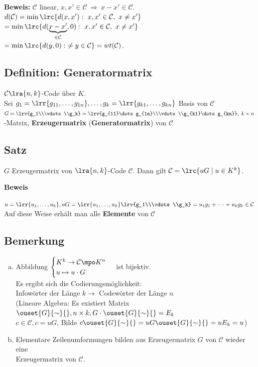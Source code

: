 		\textbf{Beweis:} $ \mathcal{C} $ linear, $ x,x'\in\mathcal{C}\ \Rightarrow\ x-x'\in\mathcal{C} $.\\
		$ d(\mathcal{C})=\min\lrc{d(x,x'):\ x,x'\in\mathcal{C},\ x\neq x'} $\\
		$ =\min\lrc{d(\underbrace{x-x'}_{\in\mathcal{C}},0):\ x,x'\in\mathcal{C},\ x\neq x'} $\\
		$ =\min\lrc{d(y,0):\  \neq y\in\mathcal{C}}=wt(\mathcal{C}) $.
		
	\subsection{Definition: Generatormatrix}
		$\mathcal{C}\lra{n,k}$-Code über $K$.\\
		Sei $g_1=\lrr{g_{11},\dots,g_{1n}},\dots,g_k=\lrr{g_{k1},\dots,g_{kn}}$ Basis von $\mathcal{C}$\\
		$G=\lrv{g_1\\\vdots\\g_k}=\lrv{g_{11}\dots g_{1n}\\\vdots\\g_{k1}\dots g_{kn}},\; k\times n$-Matrix, \textbf{Erzeugermatrix} (\textbf{Generatormatrix}) von $\mathcal{C}$

	\subsection{Satz}
		$G$ Erzeugermatrix von $\lra{n,k}$-Code $\mathcal{C}$. Dann gilt $\mathcal{C}=\lrc{uG\mid u\in K^k}$.

		\textbf{Beweis}

		$u=\lrr{u_1,\dots,u_k}, uG=\lrr{u_1,\dots,u_k}\lrv{g_1\\\vdots\\g_k}=u_1g_1+\dots+u_kg_k\in\mathcal{C}$\\
		Auf diese Weise erhält man alle \textbf{Elemente} von $\mathcal{C}$

	\subsection{Bemerkung}
		\begin{enumerate}[a)]
			\item Abbildung $\begin{cases} K^k\rightarrow\mathcal{C}\mpo K^n\\u\mapsto u\cdot G\end{cases}$ ist bijektiv.\\
				Es ergibt sich die Codierungsmöglichkeit:\\
				Infowörter der Länge $k\rightarrow$ Codewörter der Länge $n$\\
				(Lineare Algebra: Es existiert Matrix $\ouset{G}{\sim}{}, n\times k, G\cdot\ouset{G}{\sim}{}=E_k$\\
				$c\in\mathcal{C}, c=uG$, Bilde $c\ouset{G}{\sim}{}=uG\ouset{G}{\sim}{}=uE_k=u$)
			\item Elementare Zeilenumformungen bilden aus Erzeugermatrix $G$ von $\mathcal{C}$ wieder eine \\Erzeugermatrix von $\mathcal{C}$.
		\end{enumerate}

